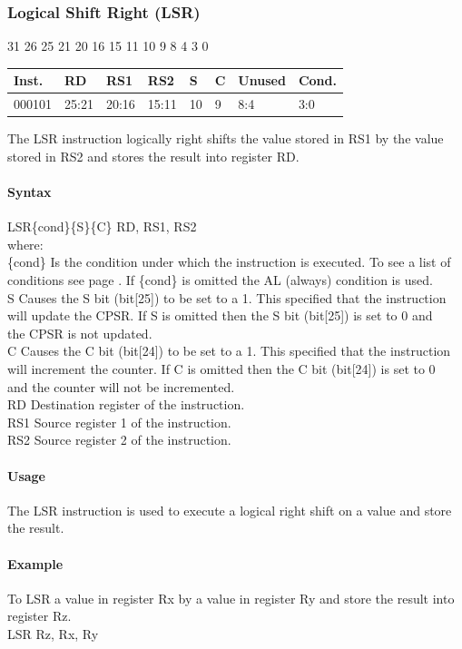 \documentclass[12pt]{article}
\newcommand{\aTypeInstruction}[6]
{%
    \hspace{1.6cm}31 \hspace{1.15cm}26 \hspace{.04cm}25 \hspace{.8cm}21 \hspace{.04cm}20 \hspace{.8cm}16 \hspace{.04cm}15 \hspace{.8cm}11 \hspace{.04cm}10 \hspace{.275cm}9 \hspace{.275cm}8 \hspace{1.175cm}4 \hspace{.04cm}3 \hspace{1.25cm}0
    \vspace{-.25cm}
    \begin{center}
        \begin{tabular}{ |p{1.8cm}|p{1.5cm}|p{1.5cm}|p{1.5cm}|p{0.3cm}|p{0.3cm}|p{1.5cm}|p{1.5cm}| }
            \hline
            \textbf{Inst.} & \textbf{RD}& \textbf{RS1} & \textbf{RS2} & \textbf{S} & \textbf{C} & Unused & \textbf{Cond.}\\
            \hline
            #1 & 25:21 & 20:16 & 15:11 & 10 & 9 & 8:4 &3:0\\
            \hline
        \end{tabular}
    \end{center}
    
    \noindent
    #2\\
    
    \paragraph{Syntax}
    \begin{flushleft}
    #3\{cond\}\{S\}\{C\} RD, RS1, RS2\\
    \vspace{1em}        %
    where:\\
    \vspace{1em}
    \{cond\}    \hspace{2em} Is the condition under which the instruction is executed. To see a list of\\
                \hspace{5.4em} conditions see page . If \{cond\} is omitted the AL (always) condition is used.\\
    \vspace{1em}    
    S       \hspace{4.5em} Causes the S bit (bit[25]) to be set to a 1. This specified that the instruction\\
            \hspace{5.4em} will update the CPSR. If S is omitted then the S bit (bit[25]) is set to 0 and\\
            \hspace{5.4em} the CPSR is not updated.\\
    \vspace{1em}    
    C       \hspace{4.5em} Causes the C bit (bit[24]) to be set to a 1. This specified that the instruction\\
            \hspace{5.4em} will increment the counter. If C is omitted then the C bit (bit[24]) is set to 0\\
            \hspace{5.4em} and the counter will not be incremented.\\
    \vspace{1em}
    RD  \hspace{3.6em} Destination register of the instruction.\\
    \vspace{1em}
    RS1  \hspace{3.35em} Source register 1 of the instruction.\\
    \vspace{1em}
    RS2  \hspace{3.35em} Source register 2 of the instruction.\\
    \end{flushleft}
    
    \paragraph{Usage}
    \begin{flushleft}
    #4\\
    \end{flushleft}
    \paragraph{Example}
    \begin{flushleft}
    #5\\
    \vspace{1em}
    #6
    \end{flushleft}
    }
\begin{document}
   
   




    \newpage
    \subsubsection{Logical Shift Right (LSR)}
    
    \aTypeInstruction
    {000101}
    {The LSR instruction logically right shifts the value stored in RS1 by the value stored in RS2 and stores the result into register RD.}
    {LSR}
    {The LSR instruction is used to execute a logical right shift on a value and store the result.}
    {To LSR a value in register Rx by a value in register Ry and store the result into register Rz.}
    {LSR Rz, Rx, Ry}
    
\end{document}

